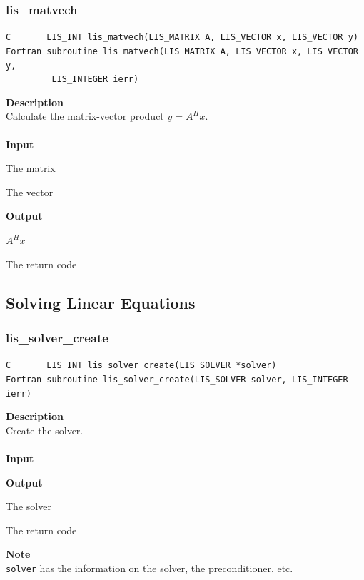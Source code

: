 \documentclass[a4paper]{article}
\newcommand{\namelistlabel}[1]{\mbox{#1}\hfill}
\newenvironment{namelist}[1]{%
\begin{list}{}
  {\let\makelabel\namelistlabel
  \settowidth{\labelwidth}{#1}
  \setlength{\leftmargin}{1.1\labelwidth}}
  }{%
\end{list}}
\begin{document}
\subsubsection{lis\_matvech}
\begin{screen}
\verb|C       LIS_INT lis_matvech(LIS_MATRIX A, LIS_VECTOR x, LIS_VECTOR y)|\\
\verb|Fortran subroutine lis_matvech(LIS_MATRIX A, LIS_VECTOR x, LIS_VECTOR y,|\\
\verb|         LIS_INTEGER ierr)|
\end{screen}
{\bf Description}\\
\indent
Calculate the matrix-vector product $y=A^{H}x$.
\\ \\
\noindent
{\bf Input}
\begin{namelist}{XXXXXXXXXXXXXXXXXXXX}
\item[\tt A] The matrix
\item[\tt x] The vector
\end{namelist}
{\bf Output}
\begin{namelist}{XXXXXXXXXXXXXXXXXXXX}
\item[\tt y] $A^{H}x$
\item[\tt ierr] The return code
\end{namelist}

\newpage
\subsection{Solving Linear Equations}
\subsubsection{lis\_solver\_create}
\begin{screen}
\verb|C       LIS_INT lis_solver_create(LIS_SOLVER *solver)|\\
\verb|Fortran subroutine lis_solver_create(LIS_SOLVER solver, LIS_INTEGER ierr)|
\end{screen}
{\bf Description}\\
\indent
Create the solver.
\\ \\
\noindent
{\bf Input}
\begin{namelist}{XXXXXXXXXXXXXXXXXXXX}
\item[None]
\end{namelist}
{\bf Output}
\begin{namelist}{XXXXXXXXXXXXXXXXXXXX}
\item[\tt solver] The solver
\item[\tt ierr] The return code
\end{namelist}
{\bf Note}\\
\indent
\verb|solver| has the information on the solver, the preconditioner, etc.
\end{document}
